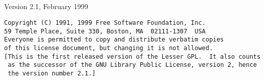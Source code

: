 \subsection*{
}
\label{SEC12}

Version 2.1, February 1999 

\footnotesize
\begin{verbatim}
Copyright (C) 1991, 1999 Free Software Foundation, Inc.
59 Temple Place, Suite 330, Boston, MA  02111-1307  USA
Everyone is permitted to copy and distribute verbatim copies
of this license document, but changing it is not allowed.
[This is the first released version of the Lesser GPL.  It also counts
 as the successor of the GNU Library Public License, version 2, hence
 the version number 2.1.]
\end{verbatim}
\normalsize

\subsection*{
}
\label{SEC23}

